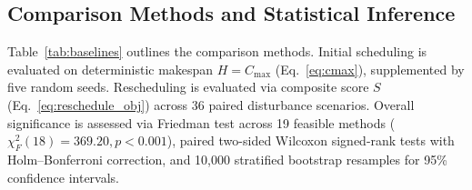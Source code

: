 \documentclass[journal,10pt]{IEEEtran}
\begin{document}
\subsection{Comparison Methods and Statistical Inference}

Table~\ref{tab:baselines} outlines the comparison methods. Initial scheduling is evaluated on deterministic makespan $H=C_{\max}$ (Eq.~\eqref{eq:cmax}), supplemented by five random seeds. Rescheduling is evaluated via composite score $S$ (Eq.~\eqref{eq:reschedule_obj}) across 36 paired disturbance scenarios. Overall significance is assessed via Friedman test across 19 feasible methods ($\chi_F^2(18)=369.20, p<0.001$), paired two-sided Wilcoxon signed-rank tests with Holm--Bonferroni correction, and 10,000 stratified bootstrap resamples for 95\% confidence intervals.
\end{document}
